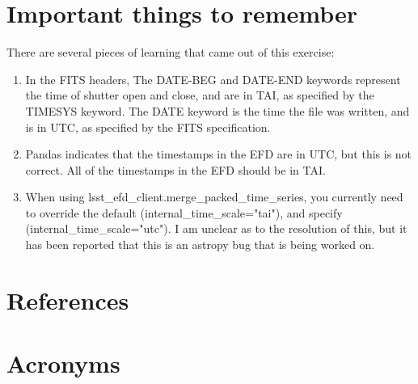 \documentclass[SE,authoryear,toc]{lsstdoc}
\begin{document}
\section{Important things to remember}

There are several pieces of learning that came out of this exercise:
\begin{enumerate}
  \item In the FITS headers, The DATE-BEG and DATE-END keywords represent the time of shutter open and close, and are in TAI, as specified by the TIMESYS keyword.  The DATE keyword is the time the file was written, and is in UTC, as specified by the FITS specification.
  \item Pandas indicates that the timestamps in the EFD are in UTC, but this is not correct.  All of the timestamps in the EFD should be in TAI.
    \item When using lsst\_efd\_client.merge\_packed\_time\_series, you currently need to override the default (internal\_time\_scale="tai"), and specify (internal\_time\_scale="utc").  I am unclear as to the resolution of this, but it has been reported that this is an astropy bug that is being worked on.
\end{enumerate}




\appendix
\section{References} \label{sec:bib}
\renewcommand{\refname}{} %


\section{Acronyms} \label{sec:acronyms}

\end{document}
